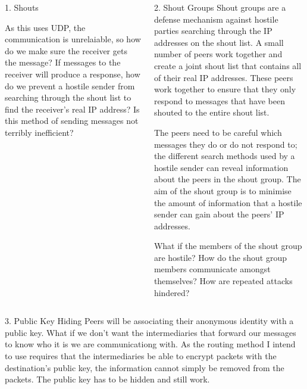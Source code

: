 \documentclass[ %
                    author={Luke Murray},
                supervisor={Dr. Simon Hollis},
                     title={Shadow Peer-to-Peer Networks},
                  subtitle={},
                    degree={MEng},
                      year={2013} ]{poster}
\begin{document}
\begin{frame}{}
\begin{columns}[t]
\begin{column}{0.422\linewidth}
\begin{block}{\normalsize 1. Shouts}

    As this uses UDP, the communication is unrelaiable, so how do we make sure the receiver gets the message? If messages to the receiver will produce a response, how do we prevent a hostile sender from searching through the shout list to find the receiver's real IP address? Is this method of sending messages not terribly inefficient?

    \end{block}
    \end{column}

    \begin{column}{0.422\linewidth}
    \begin{block}{\normalsize 2. Shout Groups}
    \small Shout groups are a defense mechanism against hostile parties searching through the IP addresses on the shout list. A small number of peers work together and create a joint shout list that contains all of their real IP addresses. These peers work together to ensure that they only respond to messages that have been shouted to the entire shout list.
    
    
    The peers need to be careful which messages they do or do not respond to; the different search methods used by a hostile sender can reveal information about the peers in the shout group. The aim of the shout group is to minimise the amount of information that a hostile sender can gain about the peers' IP addresses.
    
    What if the members of the shout group are hostile? How do the shout group members communicate amongst themselves? How are repeated attacks hindered?
    \end{block}
    \end{column}
\end{columns}

\vfill

\begin{columns}[t]
    \begin{column}{0.422\linewidth}
    \begin{block}{\normalsize 3. Public Key Hiding}
    \small Peers will be associating their anonymous identity with a public key. What if we don't want the intermediaries that forward our messages to know who it is we are communicationg with. As the routing method I intend to use requires that the intermediaries be able to encrypt packets with the destination's public key, the information cannot simply be removed from the packets. The public key has to be hidden and still work.
    

\end{block}
\end{column}
\end{columns}
\end{frame}
\end{document}
